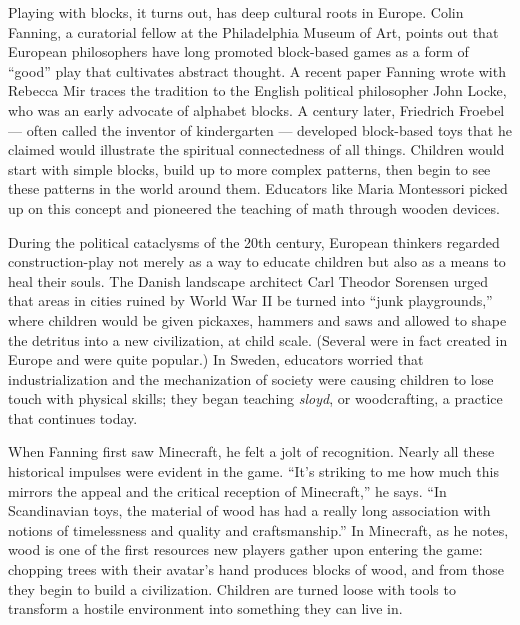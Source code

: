 Playing with blocks, it turns out, has deep cultural roots in Europe.
Colin Fanning, a curatorial fellow at the Philadelphia Museum of Art,
points out that European philosophers have long promoted block-­based
games as a form of ``good'' play that cultivates abstract thought. A
recent paper Fanning wrote with Rebecca Mir traces the tradition to the
English political philosopher John Locke, who was an early advocate of
alphabet blocks. A century later, Friedrich Froebel --- often called the
inventor of kindergarten --- developed block-­based toys that he claimed
would illustrate the spiritual connectedness of all things. Children
would start with simple blocks, build up to more complex patterns, then
begin to see these patterns in the world around them. Educators like
Maria Montessori picked up on this concept and pioneered the teaching of
math through wooden devices.

During the political cataclysms of the 20th century, European thinkers
regarded construction-­play not merely as a way to educate children but
also as a means to heal their souls. The Danish landscape architect Carl
Theodor Sorensen urged that areas in cities ruined by World War II be
turned into ``junk playgrounds,'' where children would be given
pickaxes, hammers and saws and allowed to shape the detritus into a new
civilization, at child scale. (Several were in fact created in Europe
and were quite popular.) In Sweden, educators worried that
industrialization and the mechanization of society were causing children
to lose touch with physical skills; they began teaching \emph{sloyd}, or
woodcrafting, a practice that continues today.

When Fanning first saw Minecraft, he felt a jolt of recognition. Nearly
all these historical ­impulses were evident in the game. ``It's striking
to me how much this mirrors the appeal and the critical reception of
Minecraft,'' he says. ``In Scandinavian toys, the material of wood has
had a really long association with notions of timelessness and quality
and craftsmanship.'' In Minecraft, as he notes, wood is one of the first
resources new players gather upon entering the game: chopping trees with
their avatar's hand produces blocks of wood, and from those they begin
to build a civilization. Children are turned loose with tools to
transform a hostile environment into something they can live in.

